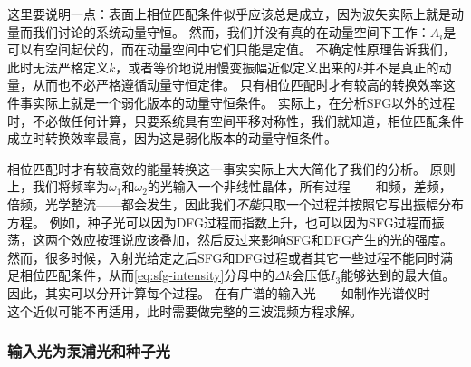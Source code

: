 这里要说明一点：表面上相位匹配条件似乎应该总是成立，因为波矢实际上就是动量而我们讨论的系统动量守恒。
然而，我们并没有真的在动量空间下工作：$A_i$是可以有空间起伏的，而在动量空间中它们只能是定值。
不确定性原理告诉我们，此时无法严格定义$k$，或者等价地说用慢变振幅近似定义出来的$k$并不是真正的动量，从而也不必严格遵循动量守恒定律。
只有相位匹配时才有较高的转换效率这件事实际上就是一个弱化版本的动量守恒条件。
实际上，在分析SFG以外的过程时，不必做任何计算，只要系统具有空间平移对称性，我们就知道，相位匹配条件成立时转换效率最高，因为这是弱化版本的动量守恒条件。

相位匹配时才有较高效的能量转换这一事实实际上大大简化了我们的分析。
原则上，我们将频率为$\omega_1$和$\omega_2$的光输入一个非线性晶体，所有过程——和频，差频，倍频，光学整流——都会发生，因此我们\emph{不能}只取一个过程并按照它写出振幅分布方程。
例如，种子光可以因为DFG过程而指数上升，也可以因为SFG过程而振荡，这两个效应按理说应该叠加，然后反过来影响SFG和DFG产生的光的强度。
然而，很多时候，入射光给定之后SFG和DFG过程或者其它一些过程不能同时满足相位匹配条件，从而\eqref{eq:sfg-intensity}分母中的$\Delta k$会压低$I_3$能够达到的最大值。
因此，其实可以分开计算每个过程。
在有广谱的输入光——如制作光谱仪时——这个近似可能不再适用，此时需要做完整的三波混频方程求解。

\subsubsection{输入光为泵浦光和种子光}\label{sec:input-pump-seed-2nd}

